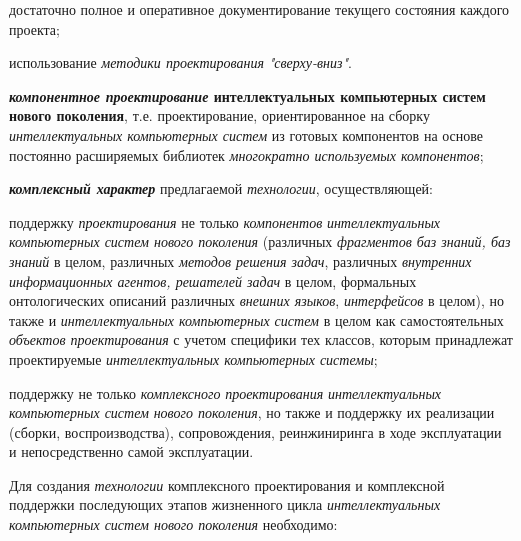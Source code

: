 \begin{textitemize}
\begin{textitemize}
		\item  достаточно полное и оперативное документирование текущего состояния каждого проекта;
		
		\item  использование \textit{методики проектирования} \textit{"сверху-вниз"{}}.
	\end{textitemize}
	
	\item \textbf{\textit{компонентное проектирование} интеллектуальных компьютерных систем нового поколения}, т.е. проектирование, ориентированное на сборку \textit{интеллектуальных компьютерных систем} из готовых компонентов на основе постоянно расширяемых библиотек \textit{многократно используемых компонентов};
	
	\item  \textbf{\textit{комплексный характер}} предлагаемой \textit{технологии}, осуществляющей:
	
	\begin{textitemize}
		\item  поддержку \textit{проектирования} не только \textit{компонентов} \textit{интеллектуальных компьютерных систем нового поколения} (различных \textit{фрагментов баз знаний, баз знаний} в целом, различных \textit{методов решения задач}, различных \textit{внутренних информационных агентов, решателей задач} в целом, формальных онтологических описаний различных \textit{внешних языков}, \textit{интерфейсов} в целом), но также и \textit{интеллектуальных компьютерных систем} в целом как самостоятельных \textit{объектов проектирования} с учетом специфики тех классов, которым принадлежат проектируемые \textit{интеллектуальных компьютерных системы};
		
		\item  поддержку не только \textit{комплексного} \textit{проектирования} \textit{интеллектуальных компьютерных систем} \textit{нового поколения}, но также и поддержку их реализации (сборки, воспроизводства), сопровождения, реинжиниринга в ходе эксплуатации и непосредственно самой эксплуатации.
		
	\end{textitemize}
\end{textitemize}

Для создания \textit{технологии} комплексного проектирования и комплексной поддержки последующих этапов жизненного цикла \textit{интеллектуальных компьютерных систем нового поколения} необходимо:

